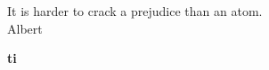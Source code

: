 \documentclass[a4paper,12pt,bibliography=totoc,index=totoc,twoside,francais]{scrbook}
\let\Oldgls\gls%
\renewcommand{\gls}[1]{%
\textbf{ \Oldgls{#1}} 
}
\begin{document}


\frontmatter
\begin{flushright}
It is harder to crack a prejudice than an atom.\\
Albert \\
\end{flushright}

\tableofcontents
\listoftables
\listoffigures

\mainmatter




%





\appendix

%
\gls{ti}

\backmatter
\nocite{*}
\printbibliography
\printindex

\glsaddall
\printglossaries

\cleardoublepage

\end{document}

